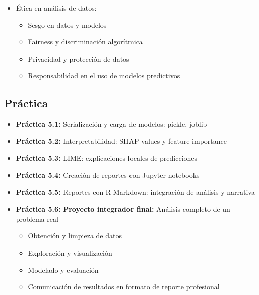\documentclass[a4paper,11pt]{article}
\begin{document}
\begin{itemize}[leftmargin=*]
\begin{itemize}
        \item R Markdown: integración de código R, LaTeX, markdown
        \item Exportación a HTML, PDF, presentaciones
        \item Documentación de código y análisis
    \end{itemize}
    \item Ética en análisis de datos:
    \begin{itemize}
        \item Sesgo en datos y modelos
        \item Fairness y discriminación algorítmica
        \item Privacidad y protección de datos
        \item Responsabilidad en el uso de modelos predictivos
    \end{itemize}
\end{itemize}

\subsection{Práctica}
\begin{itemize}[leftmargin=*, labelindent=0pt, label={\textcolor{practicacolor}{$\blacktriangleright$}}]
    \item \textbf{Práctica 5.1:} Serialización y carga de modelos: pickle, joblib
    \item \textbf{Práctica 5.2:} Interpretabilidad: SHAP values y feature importance
    \item \textbf{Práctica 5.3:} LIME: explicaciones locales de predicciones
    \item \textbf{Práctica 5.4:} Creación de reportes con Jupyter notebooks
    \item \textbf{Práctica 5.5:} Reportes con R Markdown: integración de análisis y narrativa
    \item \textbf{Práctica 5.6:} \textbf{Proyecto integrador final:} Análisis completo de un problema real
    \begin{itemize}
        \item Obtención y limpieza de datos
        \item Exploración y visualización
        \item Modelado y evaluación
        \item Comunicación de resultados en formato de reporte profesional
    \end{itemize}
\end{itemize}
\end{document}
